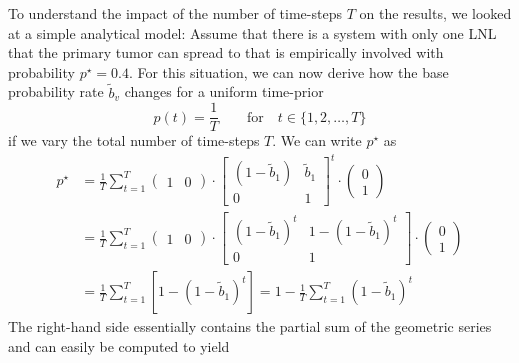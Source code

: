 \documentclass[\relativeRoot/main.tex]{subfiles}
\begin{document}
To understand the impact of the number of time-steps $T$ on the results, we looked at a simple analytical model: Assume that there is a system with only one LNL that the primary tumor can spread to that is empirically involved with probability $p^{\star} = 0.4$. For this situation, we can now derive how the base probability rate $\tilde{b}_v$ changes for a uniform time-prior
%
\begin{equation}
    p(t) = \frac{1}{T} \qquad \text{for} \quad t \in \{ 1, 2, \ldots, T \}
\end{equation}
%
if we vary the total number of time-steps $T$. We can write $p^{\star}$ as
%
\begin{equation}
    \begin{aligned}
        p^{\star} &= \frac{1}{T} \sum_{t=1}^T{
            \begin{pmatrix}
                1 & 0
            \end{pmatrix}
            \cdot
            \begin{bmatrix}
                (1 - \tilde{b}_1) & \tilde{b}_1 \\
                0 & 1
            \end{bmatrix}^t
            \cdot
            \begin{pmatrix}
                0 \\
                1
            \end{pmatrix}
        } \\
        &= \frac{1}{T} \sum_{t=1}^T{
            \begin{pmatrix}
                1 & 0
            \end{pmatrix}
            \cdot
            \begin{bmatrix}
                (1 - \tilde{b}_1)^t & 1 - (1 - \tilde{b}_1)^t \\
                0 & 1
            \end{bmatrix}
            \cdot
            \begin{pmatrix}
                0 \\
                1
            \end{pmatrix}
        } \\
        &= \frac{1}{T} \sum_{t=1}^T{ \left[ 1 - (1 - \tilde{b}_1)^t \right] }
        = 1 - \frac{1}{T} \sum_{t=1}^T{(1 - \tilde{b}_1)^t}
    \end{aligned}
\end{equation}
%
The right-hand side essentially contains the partial sum of the geometric series and can easily be computed to yield
\end{document}
